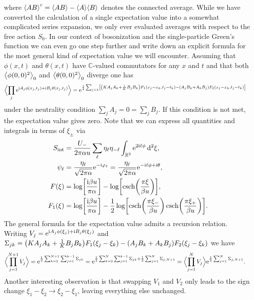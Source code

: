 \documentclass[english, parskip=full]{scrartcl}
\begin{document}
where $\bra*{AB}^c = \bra*{AB} - \bra*{A}\bra*{B}$ denotes the connected average.
While we have converted the calculation of a single expectation value into a somewhat complicated series expansion, we only ever evaluated averages with respect to the free action $S_0$.
In our context of bosonization and the single-particle Green's function we can even go one step further and write down an explicit formula for the most general kind of expectation value we will encounter.
Assuming that $\phi(x,t)$ and $\theta(x,t)$ have $\mathbb{C}$-valued commutators for any $x$ and $t$ and that both $\bra*{\phi(0,0)^2}_0$ and $\bra*{\theta(0,0)^2}_0$ diverge one has
\begin{align}
\bra[\Big]{\prod_j \powe{\i A_j\phi(x_j,t_j) + \i B_j\theta(x_j,t_j)}} &= \powe{\frac{1}{2} \sum_{j<k} \klb*{\kla*{K A_jA_k + \frac{1}{K} B_jB_k} F_1(x_j-x_k,t_j-t_k) - \kla*{A_jB_k + A_kB_j} F_2(x_j-x_k,t_j-t_k)}}
\end{align}
under the neutrality condition $\sum_jA_j=0=\sum_jB_j$.
If this condition is not met, the expectation value gives zero.
Note that we can express all quantities and integrals in terms of $\xi_\pm$ via
\begin{align}
S_\Text{int} &= \frac{U_-}{2\pi\alpha u} \sum_\ell \eta_\ell \eta_{-\ell} \intrnd{2}{\powe{2\i\ell\phi}}{\xi},\\
\psi_\ell &= \frac{\eta_\ell}{\sqrt{2\pi\alpha}} \powe{-\i\varphi_\ell} = \frac{\eta_\ell}{\sqrt{2\pi\alpha}} \powe{-\i \ell \phi + \i \theta},\\
F(\xi) &= \log\klb*{\frac{\i\beta u}{\pi\alpha}} - \log\klb*{\csch\kla*{\frac{\pi \xi}{\beta u}}},\\
F_1(\xi) &= \log\klb*{
\frac{\i\beta u}{\pi\alpha}} - \frac{1}{2}\log\klb*{ \csch\kla*{\frac{\pi \xi_-}{\beta u}} \csch\kla*{\frac{\pi \xi_+}{\beta u}}}.
\end{align}
The general formula for the expectation value admits a recursion relation.
Writing $V_j = \powe{\i A_j\phi(\xi_j) + \i B_j \theta(\xi_j)}$ and $\Sigma_{jk} = \kla*{KA_jA_k + \frac{1}{K} B_jB_k}F_1(\xi_j-\xi_k) - \kla*{A_jB_k + A_kB_j}F_2(\xi_j-\xi_k)$ we have
\begin{align}
\bra[\Big]{\prod_{j=1}^{N+1} V_j } &= \powe{\frac{1}{2} \sum_{k=2}^{N+1} \sum_{j=1}^{k-1} \Sigma_{jk}} = \powe{\frac{1}{2} \sum_{k=2}^N \sum_{j=1}^{k-1} \Sigma_{jk} + \frac{1}{2}\sum_{j=1}^N \Sigma_{j,N+1} } = \bra[\Big]{\prod_{j=1}^NV_j} \powe{\frac{1}{2} \sum_{j=1}^N \Sigma_{j,N+1}}.
\end{align}
Another interesting observation is that swapping $V_1$ and $V_2$ only leads to the sign change $\xi_1 - \xi_2 \rightarrow \xi_2 - \xi_1$, leaving everything else unchanged.
\end{document}
